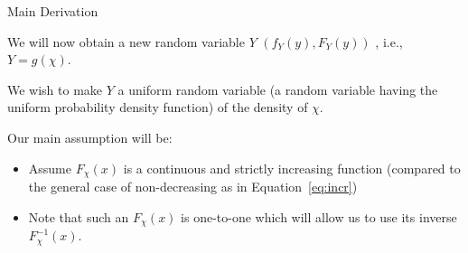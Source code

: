 %
%
\begin{slide}{Main Derivation}
\begin{titlelist}{}{}

\item<2-> 
We will now obtain a new random variable $Y$ $(f_Y(y),F_Y(y))$ , i.e., $Y=g(\chi)$.

\item<3-> 
We wish to make $Y$ a uniform random variable
(a random variable having the uniform probability density
function)  of the density of $\chi$.

\item<4-> 
Our main assumption will be:

\begin{itemize}
\item<5-> 
Assume $F_{\chi}(x)$ is a continuous and strictly increasing function
(compared to the general case of non-decreasing as in Equation~\eqref{eq:incr})
\item<6-> Note that such an $F_{\chi}(x)$ is one-to-one which
will allow us to use its inverse $F_{\chi}^{-1}(x)$.
\end{itemize}

\end{titlelist}

\end{slide}



